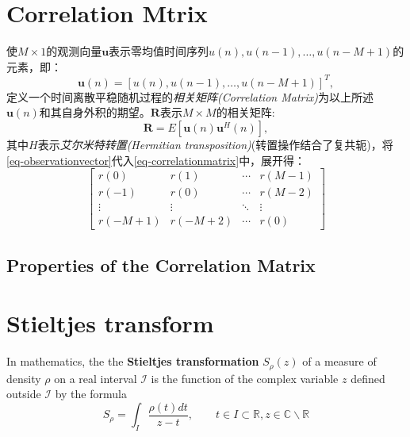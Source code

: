 \section{Correlation Mtrix}
使$M\times 1$的观测向量$\mathbf{u}$表示零均值时间序列$u(n),u(n-1),\dots,u(n-M+1)$的元素，即：
\begin{equation}
    \mathbf{u}(n) = \left[ u(n),u(n-1),\dots,u(n-M+1) \right]^T,
    \label{eq-observationvector}
\end{equation}
定义一个时间离散平稳随机过程的\emph{\textcolor[rgb]{1,0,0}{相关矩阵(Correlation Matrix)}}为以上所述$\mathbf{u}(n)$和其自身外积的期望。$\mathbf{R}$表示$M\times M$的相关矩阵:
\begin{equation}
    \mathbf{R} = E[\mathbf{u}(n)\mathbf{u}^H(n)],
    \label{eq-correlationmatrix}
\end{equation}
其中$H$表示\emph{\textcolor[rgb]{1,0,0}{艾尔米特转置(Hermitian transposition)}}(转置操作结合了复共轭)，将\cref{eq-observationvector}代入\cref{eq-correlationmatrix}中，展开得：
\begin{equation}
    \left[      
        \begin{array}{cccc}
        r(0) & r(1) & \cdots & r(M-1)\\
        r(-1) & r(0) & \cdots & r(M-2)\\
        \vdots & \vdots & \ddots & \vdots\\
        r(-M+1) & r(-M+2) & \cdots & r(0)
    \end{array}
    \right]
    \label{eq-correlationmatrixexpanded}
\end{equation}
\subsection{Properties of the Correlation Matrix}


\section{Stieltjes transform}
In mathematics, the the \textbf{\textcolor[rgb]{1,0,0}{Stieltjes transformation}} $S_{\rho}(z)$ of a measure of density $\rho$ on a real interval $\mathcal{I}$ is the function of the complex variable $z$ defined outside $\mathcal{I}$ by the formula
\begin{equation}
    S_{\rho} = \int_I \dfrac{\rho(t) dt}{z-t}, \qquad t \in I \subset \mathbb{R}, z\in \mathbb{C} \backslash \mathbb{R}
    \label{eq-Stieltjes}
\end{equation}


